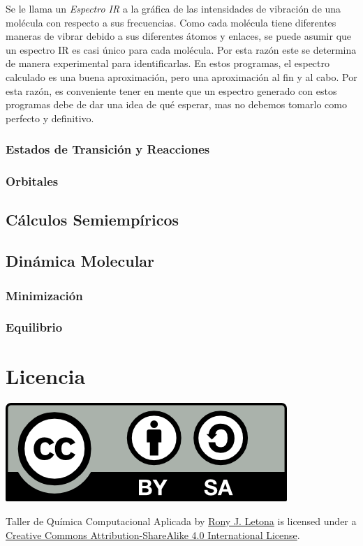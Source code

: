\documentclass[10pt,letterpaper]{article}
\begin{document}
Se le llama un \emph{Espectro IR} a la gr\'afica de las intensidades de vibraci\'on de una mol\'ecula con respecto a sus frecuencias. Como cada mol\'ecula tiene diferentes maneras de vibrar debido a sus diferentes \'atomos y enlaces, se puede asumir que un espectro IR es casi \'unico para cada mol\'ecula. Por esta raz\'on este se determina de manera experimental para identificarlas. En estos programas, el espectro calculado es  una buena aproximaci\'on, pero una aproximaci\'on al fin y al cabo. Por esta raz\'on, es conveniente tener en mente que un espectro generado con estos programas debe de dar una idea de qu\'e esperar, mas no debemos tomarlo como perfecto y definitivo.

\subsubsection{Estados de Transici\'on y Reacciones}

\subsubsection{Orbitales}

\subsection{C\'alculos Semiemp\'iricos}

\subsection{Din\'amica Molecular}

\subsubsection{Minimizaci\'on}

\subsubsection{Equilibrio}

\section*{Licencia}

\noindent \includegraphics{img/cc_big.png}

\noindent Taller de Qu\'imica Computacional Aplicada by \href{http://github.com/zronyj/TQCA}{Rony J. Letona} is licensed under a \href{http://creativecommons.org/licenses/by-sa/4.0/}{Creative Commons Attribution-ShareAlike 4.0 International License}.
\end{document}
